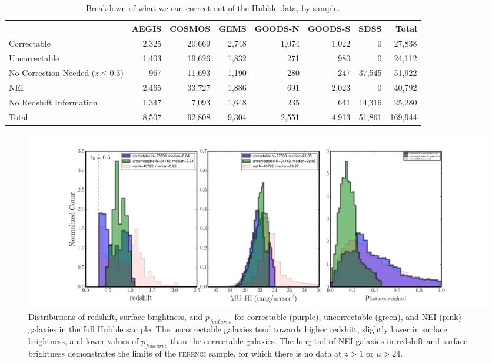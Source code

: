 \documentclass[usenatbib]{mn2e}
\newcommand{\ferengi}{\textsc{ferengi}}
\begin{document}
 
\begin{table}
\caption{Breakdown of what we can correct out of the Hubble data, by sample. \label{hubble_debiasable}}
\begin{tabular}{lrrrrrrr}
\hline\hline
                                   & AEGIS   & COSMOS & GEMS & GOODS-N & GOODS-S & SDSS    & Total \\
\hline
Correctable                        & 2,325   & 20,669 & 2,748 & 1,074  & 1,022   & 0       & 27,838\\
Uncorrectable                      & 1,403   & 19,626 & 1,832 & 271    & 980     & 0       & 24,112\\
No Correction Needed ($z \le 0.3$) & 967     & 11,693 & 1,190 & 280    & 247     & 37,545  & 51,922\\ 
NEI                                & 2,465   & 33,727 & 1,886 & 691    & 2,023   & 0       & 40,792\\
No Redshift Information            & 1,347   & 7,093  & 1,648 & 235    & 641     & 14,316  & 25,280\\
Total                              & 8,507   & 92,808 & 9,304 & 2,551  & 4,913   & 51,861  & 169,944\\
\hline\hline
\end{tabular}
\end{table}

\begin{figure}
\begin{center}
\includegraphics[width=\textwidth]{figures/hubble_z_mu_p_distributions.pdf}
\caption{Distributions of redshift, surface brightness, and $p_{features}$ for correctable (purple), uncorrectable (green), and NEI (pink) galaxies in the full Hubble sample. The uncorrectable galaxies tend towards higher redshift, slightly lower in surface brightness, and lower values of $p_{features}$ than the correctable galaxies. The long tail of NEI galaxies in redshift and surface brightness demonstrates the limits of the \ferengi{} sample, for which there is no data at $z>1$ or $\mu>24$.}
\label{fig:z_mu_p}
\end{center}
\end{figure}
\end{document}
